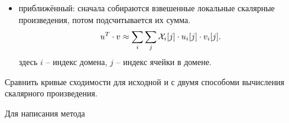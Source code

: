 \begin{enumerate}
\begin{itemize}
            где глобальные $u$, $v$ вычисляются по формулам \cref{eq:schwarz_un}.
      \item приближённый: сначала собираются взвешенные локальные скалярные произведения, потом подсчитывается их сумма.
            \begin{equation*}
            u^T \cdot v \approx \sum_i \sum_j \mathcal{X}_i[j] \cdot u_i[j] \cdot v_i[j].
            \end{equation*}
            здесь $i$ -- индекс домена, $j$ -- индекс ячейки в домене.
      \end{itemize}
      Сравнить кривые сходимости для исходной  и  с двумя способоми вычисления скалярного произведения.
\end{enumerate}


Для написания метода 

